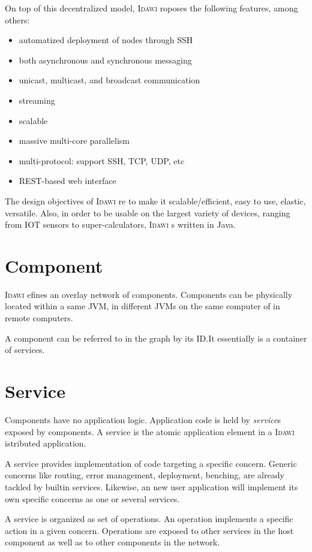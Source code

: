 \documentclass{article}
\newcommand{\idawi}[1]{\textsc{Idawi}\xspace}
\begin{document}
On top of this decentralized model, \idawi proposes the following features, among others: 
\begin{itemize}
    \item automatized deployment of nodes through SSH
    \item both asynchronous and synchronous messaging
    \item unicast, multicast, and broadcast communication
    \item streaming
    \item scalable
    \item massive multi-core parallelism
    \item multi-protocol: support SSH, TCP, UDP, etc
    \item REST-based web interface
\end{itemize}

The design objectives of \idawi are to make it scalable/efficient, easy to use, elastic, versatile. Also, in order to be usable on the largest variety of devices, ranging from IOT sensors to super-calculators, \idawi is written in Java.


\section{Component}
\idawi defines an overlay network of components. Components can be physically located within a same JVM, in different JVMs on the same computer of in remote computers.


A component can be referred to in the graph by its ID.It essentially is a container of services.




\section{Service}

Components have no application logic. Application code is held by \textit{service}s exposed by components. A service is the atomic application element in a \idawi distributed application.

A service provides implementation of code targeting a specific concern.
Generic concerns like routing, error management, deployment, benching, are already tackled by builtin services. Likewise, an new user application will implement its own specific concerns as one or several services.

A service is organized as set of operations. An operation implements a specific action in a given concern. Operations are exposed to other services in the host component as well as to other components in the network.
\end{document}
